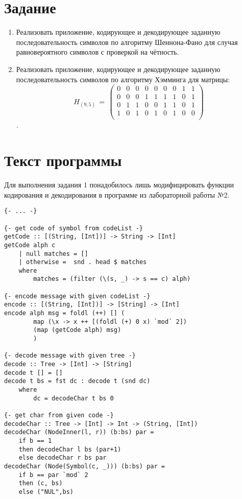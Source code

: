 \documentclass[oneside, final, 12pt]{extarticle}
\begin{document}
\section{Задание}
\begin{enumerate}
	\item Реализовать приложение, кодирующее и декодирующее заданную последовательность символов по алгоритму Шеннона-Фано для случая равновероятного символов с проверкой на чётность.
	\item Реализовать приложение, кодирующее и декодирующее заданную последовательность символов по алгоритму Хэмминга для матрицы:
		\[ H_{(9,5)}\,=\,\left(
			\begin{matrix}
				0 & 0 & 0 & 0 & 0 & 0 & 0 & 1 & 1 \\
				0 & 0 & 0 & 1 & 1 & 1 & 1 & 0 & 1 \\
				0 & 1 & 1 & 0 & 0 & 1 & 1 & 0 & 1 \\
				1 & 0 & 1 & 0 & 1 & 0 & 1 & 0 & 0 \\
			\end{matrix} \right)
		\].
\end{enumerate}

\section{Текст программы}
Для выполнения задания 1 понадобилось лишь модифицировать функции кодирования и декодирования в программе из лабораторной работы №2.

\lstset{caption=Изменения в Logic.hs}
\begin{lstlisting}[]
{- ... -}
	
{- get code of symbol from codeList -}
getCode :: [(String, [Int])] -> String -> [Int]
getCode alph c
	| null matches = []
	| otherwise =  snd . head $ matches
	where
		matches = (filter (\(s, _) -> s == c) alph)

{- encode message with given codeList -}
encode :: [(String, [Int])] -> [String] -> [Int]
encode alph msg = foldl (++) [] (
		map (\x -> x ++ [(foldl (+) 0 x) `mod` 2])
		(map (getCode alph) msg)
		)

{- decode message with given tree -}
decode :: Tree -> [Int] -> [String]
decode t [] = []
decode t bs = fst dc : decode t (snd dc)
	where
		dc = decodeChar t bs 0

{- get char from given code -}
decodeChar :: Tree -> [Int] -> Int -> (String, [Int])
decodeChar (NodeInner(l, r)) (b:bs) par =
	if b == 1
	then decodeChar l bs (par+1)
	else decodeChar r bs par
decodeChar (Node(Symbol(c, _))) (b:bs) par =
	if b == par `mod` 2
	then (c, bs)
	else ("NUL",bs)

\end{lstlisting}
\end{document}

